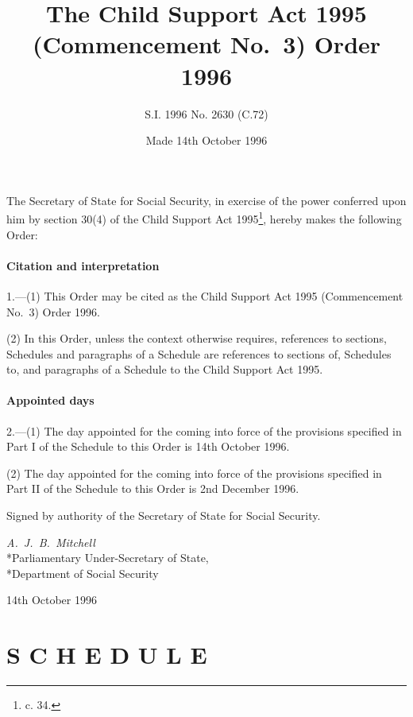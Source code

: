 \documentclass[a4paper]{article}
\title{The Child Support Act 1995 (Commencement No.\ 3) Order 1996}
\author{S.I. 1996 No. 2630 (C.72)}
\date{Made 14th October 1996%
}
\begin{document}
\maketitle

\noindent
The Secretary of State for Social Security, in exercise of the power conferred upon him by section 30(4) of the Child Support Act 1995\footnote{ c. 34.}, hereby makes the following Order:


{\sloppy

\tableofcontents

}

\setcounter{secnumdepth}{-2}

\subsection[1. Citation and interpretation]{Citation and interpretation}

1.—(1) This Order may be cited as the Child Support Act 1995 (Commencement No.\ 3) Order 1996.

(2) In this Order, unless the context otherwise requires, references to sections, Schedules and paragraphs of a Schedule are references to sections of, Schedules to, and paragraphs of a Schedule to the Child Support Act 1995.

\subsection[2. Appointed days]{Appointed days}

2.—(1) The day appointed for the coming into force of the provisions specified in Part I of the Schedule to this Order is 14th October 1996.

(2) The day appointed for the coming into force of the provisions specified in Part II of the Schedule to this Order is 2nd December 1996.

\bigskip

Signed by authority of the Secretary of State for Social Security.

{\raggedleft
\emph{A.\ J.\ B.\ Mitchell}\\*Parliamentary Under-Secretary of State,\\*Department of Social Security

}

14th October 1996

\clearpage

\part[Schedule]{S C H E D U L E}
\end{document}
